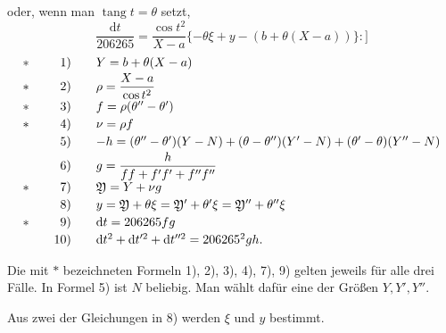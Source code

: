 \noindent oder, wenn man \(\operatorname{tang}t=\theta\) setzt,
\[
 \frac{\mathrm{d}t}{206265}=\frac{\cos t^2}{X-a}
 \{-\theta\xi+y-(b+\theta(X-a))\} :]
\]
\[
\begin{array}{@{}c@{\qquad}r@{\qquad}l@{}}
 \ast&1)&Y=b+\theta(X-a)\\[2pt]
 \ast&2)&\rho=\dfrac{X-a}{\cos t^2}\\[4pt]
 \ast&3)&f=\rho(\theta''-\theta')\\[2pt]
 \ast&4)&\nu=\rho f\\[2pt]
 &5)&-h=(\theta''-\theta')(Y-N)+(\theta-\theta'')(Y'-N)+(\theta'-\theta)(Y''-N)\\[2pt]
 &6)&g=\dfrac{h}{ff+f'f'+f''f''}\\[4pt]
 \ast&7)&\mathfrak{Y}=Y+\nu g\\[2pt]
 &8)&y=\mathfrak{Y}+\theta\xi=\mathfrak{Y}'+\theta'\xi=\mathfrak{Y}''+\theta''\xi\\[2pt]
 \ast&9)&\mathrm{d}t=206265fg\\[2pt]
 &10)&\mathrm{d}t^2+\mathrm{d}t^{\prime 2}+\mathrm{d}t^{\prime\prime 2}=206265^2gh.
\end{array}
\]

Die mit \(\ast\) bezeichneten Formeln 1), 2), 3), 4), 7), 9) gelten jeweils für alle drei Fälle. In Formel 5) ist \(N\) beliebig. Man wählt dafür eine der Größen \(Y,Y',Y''\).

Aus zwei der Gleichungen in 8) werden \(\xi\) und \(y\) bestimmt.

\bigskip
{\centering
[5.]\par{}\par}
\medskip
[Es seien \(x,y\) Näherungswerte der Koordinaten des zu bestimmenden Punktes, ferner \(a_i,b_i\) die Koordinaten der Festpunkte und \(T_i\) die auf die Ebene reduzierten Azimute an diesen Punkten. Setzt man
\[
 x-a_i=r_i\cos t_i,\qquad y-b_i=r_i\sin t_i
\]
\noindent und
\[
 -206265\,.\,\frac{y-b_i}{r_ir_i}=\alpha_i,\qquad
 206265\,.\,\frac{x-a_i}{r_ir_i}=\beta_i
\]
\[
 t_i-T_i=n_i,
\]

\par\clearpage
\noindent\null\hfill{\small\textbf{TRIGONOMETRISCHE PUNKTBESTIMMUNG.}}\hfill\makebox[0pt][r]{\fontsize{13}{16}\selectfont 229}\par\medskip

